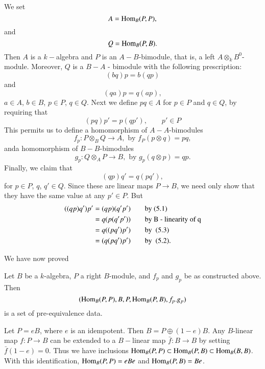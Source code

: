 We set
$$
A = \operatorname{Hom}_B (P, P), 
$$
and 
$$
Q = \operatorname{Hom}_B(P, B). 
$$
Then $A$ is a $k-$algebra and $P$ is an $A - B$-bimodule, that is, a
left $A \otimes_k B^0$-module. Moreover, $Q$ is a $B-A$ - bimodule
with the following prescription:  
\begin{equation*}
(bq)p = b(qp)\tag{5.1}
\end{equation*}
and 
\begin{equation*}
(qa)p = q (ap), \tag{5.2}
\end{equation*}
$a \in A$, $b \in B$, $p \in P$, $q \in Q$. Next we define $pq \in A$
for $p \in P$ and $q \in Q$, by requiring that  
\begin{equation*}
 (pq) p' = p (qp'), \qquad  p' \in P\tag{5.3}
\end{equation*}
This permits us to define a homomorphism of $A - A$-bimodules  
$$
f_p : P \otimes _B Q \to A, \text{ by } f_P(p \otimes q)  = pq,
$$
and\pageoriginale a homomorphism of $B - B$-bimodules 
$$
g_p : Q \otimes _A P \to B, \text{ by }g_p (q \otimes p ) = qp.
$$
Finally, we claim that 
\begin{equation*}
(qp) q' = q (pq'), \tag{5.4}
\end{equation*}
for $p \in P$, $q$, $q' \in Q$. Since these are linear maps $P \to B$,
we need only show that they have the same value at any $p' \in P$. But  
\begin{align*}
((qp)q')p' & = (qp) (q' p') \tag*{\text{by }(5.1)} \\
& = q(p(q' p')) \tag*{\text{by B - linearity of q}}\\
 & = q((pq')p') \tag*{\text{by } (5.3)}\\
 & = (q(pq')p') \tag*{\text{by } (5.2).}
\end{align*}

We have now proved 

\setcounter{prop}{4}
\begin{prop}\label{chap2:prop5.5}%
Let $B$ be a $k$-algebra, $P$ a right $B$-module, and $f_p$ and $g_p$
be as constructed above. Then  
$$
( \operatorname{Hom}_B (P, P), B, P, \operatorname{Hom}_B (P, B), f_p. g_p)
$$
is a set of pre-equivalence data. 
\end{prop}

\begin{example*} %
Let $P = eB$, where $e$ is an idempotent. Then $B = P \oplus (1
-e)B$. Any $B$-linear map $ f: P \to B$ can be extended to a $B-$linear
map $\bar{f} : B \to B$ by setting $\bar{f} (1 - e) = 0$. Thus we have
inclusions $\operatorname{Hom}_B (P, P) \subset \operatorname{Hom}_B(P, B) \subset \operatorname{Hom}_B(B, B)$. With 
this identification, $\operatorname{Hom}_B (P, P) = eBe $ and $\operatorname{Hom}_B (P, B) = Be$.  
\end{example*}

